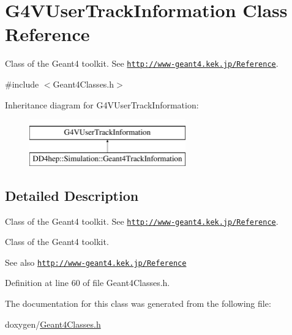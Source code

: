 \hypertarget{class_g4_v_user_track_information}{}\section{G4\+V\+User\+Track\+Information Class Reference}
\label{class_g4_v_user_track_information}


Class of the Geant4 toolkit. See \href{http://www-geant4.kek.jp/Reference}{\tt http\+://www-\/geant4.\+kek.\+jp/\+Reference}.  




{\ttfamily \#include $<$Geant4\+Classes.\+h$>$}

Inheritance diagram for G4\+V\+User\+Track\+Information\+:\begin{figure}[H]
\begin{center}
\leavevmode
\includegraphics[height=2.000000cm]{class_g4_v_user_track_information}
\end{center}
\end{figure}


\subsection{Detailed Description}
Class of the Geant4 toolkit. See \href{http://www-geant4.kek.jp/Reference}{\tt http\+://www-\/geant4.\+kek.\+jp/\+Reference}. 

Class of the Geant4 toolkit. \begin{DoxySeeAlso}{See also}
\href{http://www-geant4.kek.jp/Reference}{\tt http\+://www-\/geant4.\+kek.\+jp/\+Reference} 
\end{DoxySeeAlso}


Definition at line 60 of file Geant4\+Classes.\+h.



The documentation for this class was generated from the following file\+:\begin{DoxyCompactItemize}
\item 
doxygen/\hyperlink{_geant4_classes_8h}{Geant4\+Classes.\+h}\end{DoxyCompactItemize}
